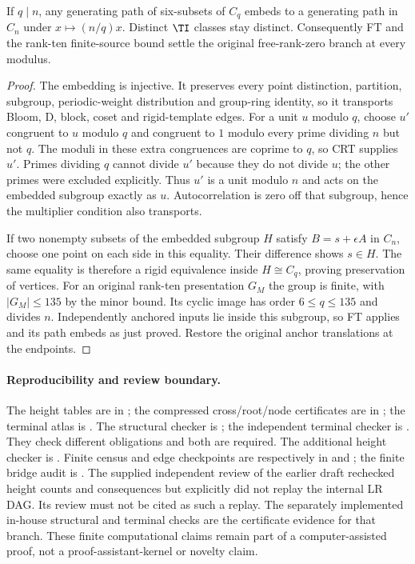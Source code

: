 \begin{lemma}[Inflation]\label{lem:inflate}
If $q\mid n$, any generating path of six-subsets of $C_q$ embeds to
a generating path in $C_n$ under $x\mapsto(n/q)x$. Distinct $\TI$
classes stay distinct. Consequently FT and the rank-ten finite-source
bound settle the original free-rank-zero branch at every modulus.
\end{lemma}
\begin{proof}
The embedding is injective. It preserves every point distinction,
partition, subgroup, periodic-weight distribution and group-ring identity,
so it transports Bloom, D, block, coset and rigid-template edges. For a
unit $u$ modulo $q$, choose $u'$ congruent to $u$ modulo $q$ and congruent
to $1$ modulo every prime dividing $n$ but not $q$. The moduli in these
extra congruences are coprime to $q$, so CRT supplies $u'$. Primes dividing
$q$ cannot divide $u'$ because they do not divide $u$; the other primes
were excluded explicitly. Thus $u'$ is a unit modulo $n$ and acts on
the embedded subgroup exactly as $u$. Autocorrelation is zero off that
subgroup, hence the multiplier condition also transports.

If two nonempty subsets of the embedded subgroup $H$ satisfy
$B=s+\epsilon A$ in $C_n$, choose one point on each side in this equality.
Their difference shows $s\in H$. The same equality is therefore a rigid
equivalence inside $H\cong C_q$, proving preservation of vertices.
For an original rank-ten presentation $G_M$ the group is finite, with
$|G_M|\le135$ by the minor bound. Its cyclic image has order
$6\le q\le135$ and divides $n$. Independently anchored inputs lie
inside this subgroup, so FT applies and its path embeds as just proved.
Restore the original anchor translations at the endpoints.
\end{proof}

\paragraph{Reproducibility and review boundary.}
The height tables are in ;
the compressed cross/root/node certificates are in
; the terminal atlas is
.
The structural checker is ;
the independent terminal checker is
.
They check different obligations and both are required. The additional
height checker is .
Finite census and edge checkpoints are respectively in
 and
; the finite bridge audit is
.
The supplied independent review of the earlier draft rechecked height
counts and consequences but explicitly did not replay the internal LR DAG.
Its review must not be cited as such a replay. The separately implemented
in-house structural and terminal checks are the certificate evidence for
that branch. These finite computational claims remain part of a
computer-assisted proof, not a proof-assistant-kernel or novelty claim.
